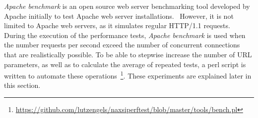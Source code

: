 \emph{Apache benchmark} is an open source web server benchmarking tool developed by Apache initially to test Apache web server installations.~\cite{apachebenchmark2013} However, it is not limited to Apache web servers, as it simulates regular HTTP/1.1 requests.\\
During the execution of the performance tests, \emph{Apache benchmark} is used when the number requests per second exceed the number of concurrent connections that are realistically possible. To be able to stepwise increase the number of URL parameters, as well as to calculate the average of repeated tests, a perl script is written to automate these operations~\footnote{\url{https://github.com/lutzengels/naxsiperftest/blob/master/tools/bench.pl}}.  These experiments are explained later in this section.
